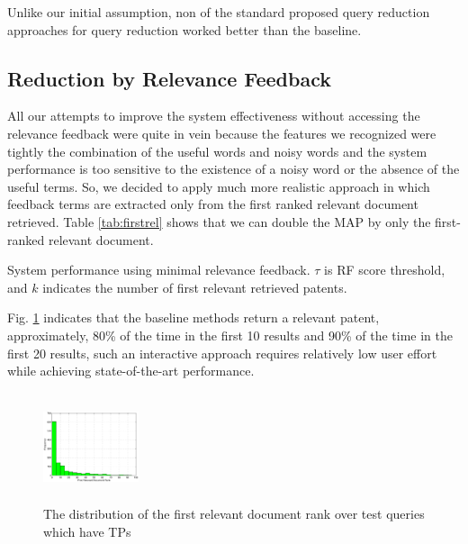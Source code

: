 Unlike our initial assumption, non of the standard proposed query reduction approaches for query reduction worked better than the baseline.
\subsection{Reduction by Relevance Feedback}
All our attempts to improve the system effectiveness without accessing the relevance feedback were quite in vein because the features we recognized were tightly the combination of the useful words and noisy words and the system performance is too sensitive to the existence of a noisy word or the absence of the useful terms. So, we decided to apply much more realistic approach in which feedback terms are extracted only from the first ranked relevant document retrieved. Table \ref{tab:firstrel} shows that we can double the MAP by only the first-ranked relevant document.
\begin{table}[htpb]
  \begin{center}
   \caption{System performance using minimal relevance feedback. $\tau$ is RF score threshold, and $k$ indicates the number of first relevant retrieved patents.}\vspace{3mm}
     
  \label{tab:firstrel}
  \end{center}  
\end{table}
Fig. \ref{fig:FirstTPRankHisto} indicates that the baseline methods return a relevant patent, approximately, 80\% of the time in the first 10 results and 90\% of the time in the first 20 results, such an interactive approach requires relatively low user effort while achieving state-of-the-art performance.    
\begin{figure}[htpb]
   \centering
   \includegraphics[width=0.25\textwidth,height=32mm]{figs/FirstTPRank.eps}
   \caption{The distribution of the first relevant document rank over test queries which have TPs}   
   \label{fig:FirstTPRankHisto} 
\end{figure}